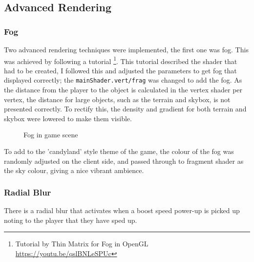 \documentclass[11pt]{report}
\begin{document}
\subsection*{Advanced Rendering}

\subsubsection*{Fog}
Two advanced rendering techniques were implemented, the first one was fog. This was achieved by following a tutorial \footnote{Tutorial by Thin Matrix for Fog in OpenGL \url{https://youtu.be/qslBNLeSPUc}}. This tutorial described the shader that had to be created, I followed this and adjusted the parameters to get fog that displayed correctly; the \colorbox{mygrey}{\lstinline{mainShader.vert/frag}} was changed to add the fog. As the distance from the player to the object is calculated in the vertex shader per vertex, the distance for large objects, such as the terrain and skybox, is not presented correctly. To rectify this, the density and gradient for both terrain and skybox were lowered to make them visible. 

\begin{figure}[H]
    \centering
    \caption{Fog in game scene}
\end{figure}

To add to the 'candyland' style theme of the game, the colour of the fog was randomly adjusted on the client side, and passed through to fragment shader as the sky colour, giving a nice vibrant ambience.

\subsubsection*{Radial Blur}
There is a radial blur that activates when a boost speed power-up is picked up noting to the player that they have sped up.
\end{document}
